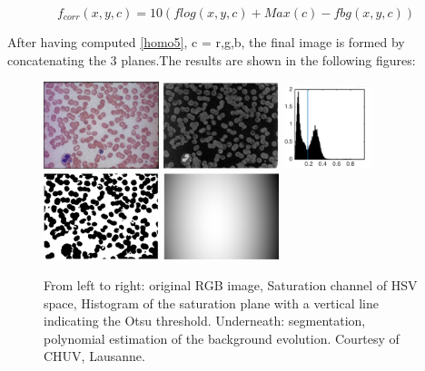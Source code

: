 \documentclass[final,a4paper,12pt,english]{UnicaPhdThesis3}
\begin{document}
{\begin{equation}\label{homo5}
f_{corr} (x, y, c) = 10(flog (x,y,c)+M ax(c)−fbg (x,y,c))
\end{equation}

After having computed \ref{homo5}, c = r,g,b, the final image is formed by concatenating the 3 planes.The results are shown in the following figures:
\begin{figure}[h]
	\centering
	\includegraphics[width=0.3\textwidth]{images/homo/homo1}
	\includegraphics[width=0.3\textwidth]{images/homo/homo2}
	\includegraphics[width=0.23\textwidth]{images/homo/homo3}
	\includegraphics[width=0.3\textwidth]{images/homo/homo4}
	\includegraphics[width=0.3\textwidth]{images/homo/homo5}
	\caption{\label{f1_homo} From left to right: original RGB image, Saturation channel of HSV space, Histogram of the saturation plane with a vertical line indicating the Otsu threshold.
	Underneath:  segmentation, polynomial estimation of the background evolution. Courtesy of CHUV, Lausanne.}
\end{figure}

}
\end{document}

